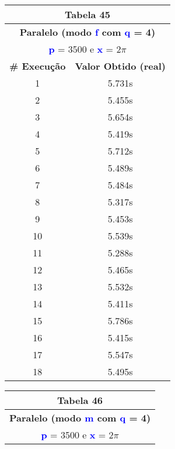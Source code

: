 \documentclass[11pt]{article}
\begin{document}
\begin{table}[!h]
	\begin{center}
		\begin{minipage}{0.48\textwidth}
			\begin{tabular}{| c | c |}
			\hline
			\multicolumn{2}{|c|}{\textbf{Tabela 45}} \\ \hline
			\multicolumn{2}{|c|}{\textbf{Paralelo (modo \textbf{\textcolor{blue}{f}} com \textbf{\textcolor{blue}{q}} = 4)}} \\
			\multicolumn{2}{|c|}{\textbf{\textcolor{blue}{p}} = 3500 e \textbf{\textcolor{blue}{x}} = $2\pi$} \\ [0.2ex]
			\hline
				\textbf{\# Execução} &  \textbf{Valor Obtido (real)} \\ \hline
				1 & 5.731s \\ \hline
				2 & 5.455s \\ \hline
				3 & 5.654s \\ \hline
				4 & 5.419s \\ \hline
				5 & 5.712s \\ \hline
				6 & 5.489s \\ \hline
				7 & 5.484s \\ \hline
				8 & 5.317s \\ \hline
				9 & 5.453s \\ \hline
				10 & 5.539s \\ \hline
				11 & 5.288s \\ \hline
				12 & 5.465s \\ \hline
				13 & 5.532s \\ \hline
				14 & 5.411s \\ \hline
				15 & 5.786s \\ \hline
				16 & 5.415s \\ \hline
				17 & 5.547s \\ \hline
				18 & 5.495s \\ \hline
			\end{tabular}
		\end{minipage}
		\begin{minipage}{0.48\textwidth}
			\begin{tabular}{| c | c |}
			\hline
			\multicolumn{2}{|c|}{\textbf{Tabela 46}} \\ \hline
			\multicolumn{2}{|c|}{\textbf{Paralelo (modo \textbf{\textcolor{blue}{m}} com \textbf{\textcolor{blue}{q}} = 4)}} \\
			\multicolumn{2}{|c|}{\textbf{\textcolor{blue}{p}} = 3500 e \textbf{\textcolor{blue}{x}} = $2\pi$} \\ [0.2ex]

\end{tabular}
\end{minipage}
\end{center}
\end{table}
\end{document}
